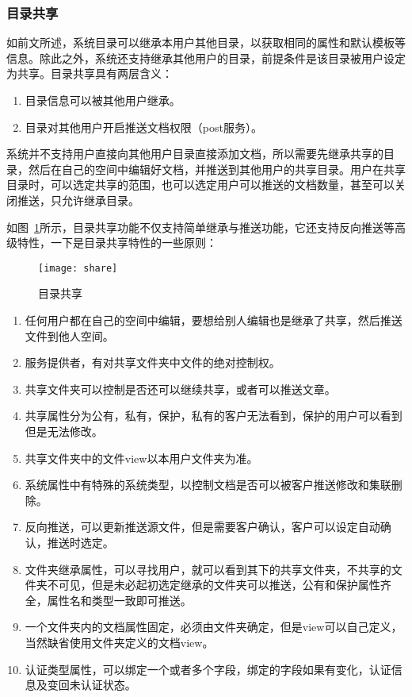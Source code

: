 \subsubsection{目录共享}
\label{sec:foldshare}

如前文所述，系统目录可以继承本用户其他目录，以获取相同的属性和默认模板等信息。除此之外，系统还支持继承其他用户的目录，前提条件是该目录被用户设定为共享。目录共享具有两层含义：
\begin{enumerate}
\item 目录信息可以被其他用户继承。
\item 目录对其他用户开启推送文档权限（post服务）。
\end{enumerate}
系统并不支持用户直接向其他用户目录直接添加文档，所以需要先继承共享的目录，然后在自己的空间中编辑好文档，并推送到其他用户的共享目录。用户在共享目录时，可以选定共享的范围，也可以选定用户可以推送的文档数量，甚至可以关闭推送，只允许继承目录。

如图~\ref{fig:xfig13}所示，目录共享功能不仅支持简单继承与推送功能，它还支持反向推送等高级特性，一下是目录共享特性的一些原则：
\begin{figure}[H]
  \centering
  \texttt{[image: share]}
  \caption{目录共享}
  \label{fig:xfig13}
\end{figure}
\begin{enumerate}
\item 任何用户都在自己的空间中编辑，要想给别人编辑也是继承了共享，然后推送文件到他人空间。
\item 服务提供者，有对共享文件夹中文件的绝对控制权。
\item 共享文件夹可以控制是否还可以继续共享，或者可以推送文章。
\item 共享属性分为公有，私有，保护，私有的客户无法看到，保护的用户可以看到但是无法修改。
\item 共享文件夹中的文件view以本用户文件夹为准。
\item 系统属性中有特殊的系统类型，以控制文档是否可以被客户推送修改和集联删除。
\item 反向推送，可以更新推送源文件，但是需要客户确认，客户可以设定自动确认，推送时选定。
\item 文件夹继承属性，可以寻找用户，就可以看到其下的共享文件夹，不共享的文件夹不可见，但是未必起初选定继承的文件夹可以推送，公有和保护属性齐全，属性名和类型一致即可推送。
\item 一个文件夹内的文档属性固定，必须由文件夹确定，但是view可以自己定义，当然缺省使用文件夹定义的文档view。
\item 认证类型属性，可以绑定一个或者多个字段，绑定的字段如果有变化，认证信息及变回未认证状态。
\end{enumerate}

